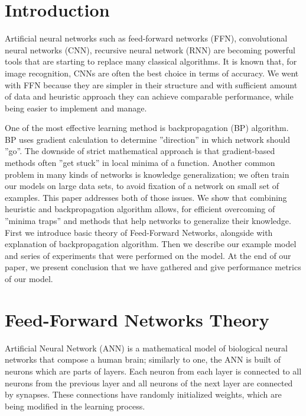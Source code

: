 \documentclass[conference]{IEEEtran}
\begin{document}
	
	\vspace{10pt}
	
	\section{Introduction}
	Artificial neural networks such as feed-forward networks (FFN), convolutional neural networks (CNN), recursive neural network (RNN) are becoming powerful tools that are starting to replace many classical algorithms. It is known that, for image recognition, CNNs are often the best choice in terms of accuracy. We went with FFN because they are simpler in their structure and with sufficient amount of data and heuristic approach they can achieve comparable performance, while being easier to implement and manage.
	
	One of the most effective learning method is backpropagation (BP) algorithm. BP uses gradient calculation to determine ''direction'' in which network should ''go''. The downside of strict mathematical approach is that gradient-based methods often ''get stuck'' in local minima of a function. Another common problem in many kinds of networks is knowledge generalization; we often train our models on large data sets, to avoid fixation of a network on small set of examples. This paper addresses both of those issues. We show that combining heuristic and backpropagation algorithm allows, for efficient overcoming of ''minima traps'' and methods that help networks to generalize their knowledge. First we introduce basic theory of Feed-Forward Networks, alongside with explanation of backpropagation algorithm. Then we describe our example model and series of experiments that were performed on the model. At the end of our paper, we present conclusion that we have gathered and give performance metrics of our model.
	
	
	\section{Feed-Forward Networks Theory}
	Artificial Neural Network (ANN) is a mathematical model of biological neural networks that compose a human brain; similarly to one, the ANN is built of neurons which are parts of layers. Each neuron from each layer is connected to all neurons from the previous layer and all neurons of the next layer are connected by synapses. These connections have randomly initialized weights, which are being modified in the learning process.
	
\end{document}
